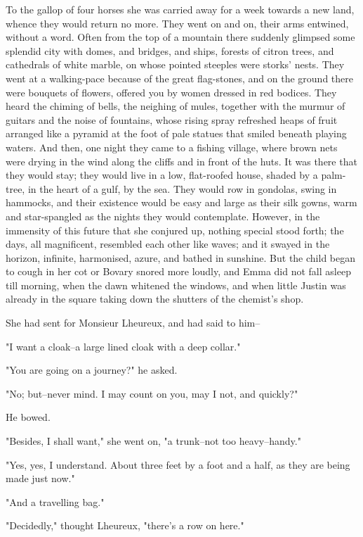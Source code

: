 \documentclass{tufte-book}
\begin{document}
To the gallop of four horses she was carried away for a week towards a
new land, whence they would return no more. They went on and on, their
arms entwined, without a word. Often from the top of a mountain there
suddenly glimpsed some splendid city with domes, and bridges, and
ships, forests of citron trees, and cathedrals of white marble, on whose
pointed steeples were storks' nests. They went at a walking-pace because
of the great flag-stones, and on the ground there were bouquets of
flowers, offered you by women dressed in red bodices. They heard the
chiming of bells, the neighing of mules, together with the murmur of
guitars and the noise of fountains, whose rising spray refreshed heaps
of fruit arranged like a pyramid at the foot of pale statues that smiled
beneath playing waters. And then, one night they came to a fishing
village, where brown nets were drying in the wind along the cliffs and
in front of the huts. It was there that they would stay; they would live
in a low, flat-roofed house, shaded by a palm-tree, in the heart of a
gulf, by the sea. They would row in gondolas, swing in hammocks, and
their existence would be easy and large as their silk gowns, warm and
star-spangled as the nights they would contemplate. However, in the
immensity of this future that she conjured up, nothing special stood
forth; the days, all magnificent, resembled each other like waves; and
it swayed in the horizon, infinite, harmonised, azure, and bathed in
sunshine. But the child began to cough in her cot or Bovary snored
more loudly, and Emma did not fall asleep till morning, when the dawn
whitened the windows, and when little Justin was already in the square
taking down the shutters of the chemist's shop.

She had sent for Monsieur Lheureux, and had said to him--

"I want a cloak--a large lined cloak with a deep collar."

"You are going on a journey?" he asked.

"No; but--never mind. I may count on you, may I not, and quickly?"

He bowed.

"Besides, I shall want," she went on, "a trunk--not too heavy--handy."

"Yes, yes, I understand. About three feet by a foot and a half, as they
are being made just now."

"And a travelling bag."

"Decidedly," thought Lheureux, "there's a row on here."
\end{document}
